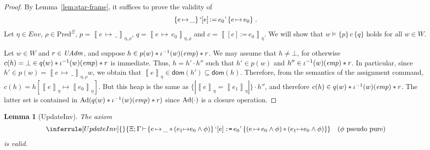 \documentclass{LMCS}
\newtheorem{lemma}[theorem]{Lemma}
\theoremstyle{remark}
\newcommand{\ALMOSTPURE}{\text{pseudo pure}\xspace}
\newcommand{\QUOTE}[1]{\textnormal{`\ensuremath{#1}'}}
\newcommand{\SYN}[1]{\ensuremath{\texttt{#1}}}
\newcommand{\record}[1]{\ensuremath{\left.\!\{\!|{#1}|\!\}\right.\!}}
\newcommand{\dom}[1]{\ensuremath{\mathsf{dom}({#1})}}
\newcommand{\COMB}{\ensuremath{\cdot}}
\newcommand{\Env}{\ensuremath{\textit{Env}}\xspace}
\newcommand{\triple}[3]{{\ensuremath{\!\left.\{ #1 \}\, #2\, \{  #3 \}\!\right.}}}
\newcommand{\wemp}{\textnormal{\textit{emp}}}
\newcommand{\den}[1]{\left\llbracket #1
  \right\rrbracket}
\newcommand{\Pred}{\ensuremath{\mathrm{Pred}}\xspace}
\newcommand{\W}{\ensuremath{W}}
\newcommand{\UNFOLD}{\ensuremath{\iota^{-1}}}
\newcommand{\X}{\ensuremath{\Xi}}
\begin{document}
\begin{proof}
By Lemma~\ref{lem:star-frame}, it suffices to prove the validity of
\[
\triple{e\,{\mapsto}\,\_}{\QUOTE{[e] \,{:=}\, e_0}}{e\,{\mapsto}\,e_0}\ .
\]
Let $\eta\in\Env$, $\rho\in\Pred^\X$, $p = \den{e\,{\mapsto}\,\_}_{\eta,\rho}$, $q = \den{e\,{\mapsto}\,e_0}_{\eta,\rho}$ and $c = \den{[e] \,\SYN{:=}\, e_0}_\eta$. 
We will show that $w\models\triple{p}{c}{q}$ holds for all $w\in\W$. 

Let $w\in\W$ and $r\in\mathit{UAdm}$, and suppose $h\in p(w) * \UNFOLD(w)(\wemp) * r$. 
We may assume that $h\neq\bot$, for otherwise $c(h) = \bot\in q(w) * \UNFOLD(w)(\wemp) * r$ is immediate. 
Thus, $h = h'\COMB h''$ such that $h'\in p(w)$ and $h''\in \UNFOLD(w)(\wemp) * r$. 
In particular, since $h'\in p(w) = \den{e\,{\mapsto}\,\_}_{\eta,\rho} w$, we obtain that $\den{e}_\eta\in\dom{h'}\subseteq\dom{h}$. 
Therefore, from the semantics of the assignment command,  
$c(h) = h[\den{e}_\eta\mapsto\den{e_0}_\eta]$. 
But this heap is the same as $\record{\den{e}_\eta = \den{e_1}_\eta}\COMB h''$, 
and therefore $c(h) \in q(w) * \UNFOLD(w)(\wemp) * r $. The latter set is contained in $\DCl(q(w) * \UNFOLD(w)(\wemp) * r)$ since $\mathrm{Ad}(\cdot)$ is a closure operation.
\end{proof}



\begin{lemma}[UpdateInv]
The axiom
\[ \inferrule[UpdateInv]{ 
}{
  \X;\Gamma\,{\adash}\,\triple{e\,{\mapsto}\,\_ \,{*}\, (e_1{\mapsto}e_0 \wedge \phi)}{\QUOTE{[e] \,\SYN{:=}\, e_0}}{(e\,{\mapsto}\,e_0\wedge  \phi) \,{*}\, (e_1{\mapsto}e_0 \wedge \phi) }
} \mbox{\quad ($\phi$ \ALMOSTPURE)}
\] 
 is valid. 
\end{lemma}
\end{document}
